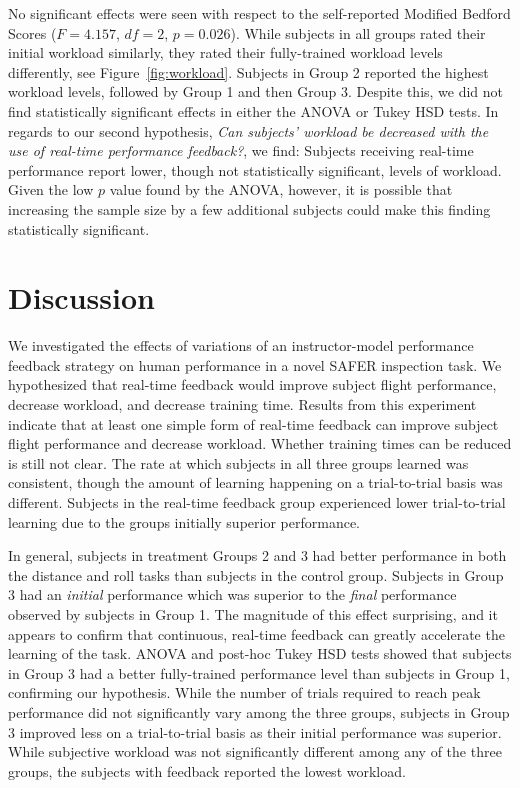 \documentclass[]{aiaa-tc}%
\begin{document}
No significant effects were seen with respect to the self-reported Modified Bedford Scores ($F=4.157$, $df = 2$, $p = 0.026$).%
While subjects in all groups rated their initial workload similarly, they rated their fully-trained workload levels differently, see Figure~\ref{fig:workload}. Subjects in Group 2 reported the highest workload levels, followed by Group 1 and then Group 3. Despite this, we did not find statistically significant effects in either the ANOVA or Tukey HSD tests. In regards to our second hypothesis, \textit{Can subjects' workload be decreased with the use of real-time performance feedback?}, we find: Subjects receiving real-time performance report lower, though not statistically significant, levels of workload. Given the low $p$ value found by the ANOVA, however, it is possible that increasing the sample size by a few additional subjects could make this finding statistically significant.

\section{Discussion}

We investigated the effects of variations of an instructor-model performance feedback strategy on human performance in a novel SAFER inspection task. We hypothesized that real-time feedback would improve subject flight performance, decrease workload, and decrease training time. Results from this experiment indicate that at least one simple form of real-time feedback can improve subject flight performance and decrease workload. Whether training times can be reduced is still not clear. The rate at which subjects in all three groups learned was consistent, though the amount of learning happening on a trial-to-trial basis was different. Subjects in the real-time feedback group experienced lower trial-to-trial learning due to the groups initially superior performance.

In general, subjects in treatment Groups 2 and 3 had better performance in both the distance and roll tasks than subjects in the control group. Subjects in Group 3 had an \textit{initial} performance which was superior to the \textit{final} performance observed by subjects in Group 1. The magnitude of this effect surprising, and it appears to confirm that continuous, real-time feedback can greatly accelerate the learning of the task. ANOVA and post-hoc Tukey HSD tests showed that subjects in Group 3 had a better fully-trained performance level than subjects in Group 1, confirming our hypothesis. While the number of trials required to reach peak performance did not significantly vary among the three groups, subjects in Group 3 improved less on a trial-to-trial basis as their initial performance was superior. While subjective workload was not significantly different among any of the three groups, the subjects with feedback reported the lowest workload.
\end{document}
